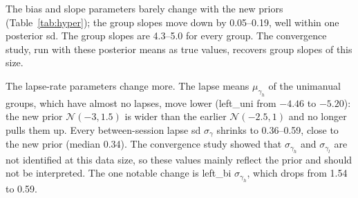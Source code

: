 \documentclass[11pt]{article}
\begin{document}
\begin{table}[H]
\centering
\caption{Hyperparameters under the earlier and current priors: posterior mean
(sd). Lapse-rate means $\mu_\gamma$ are on the logit scale.}
\label{tab:hyper}
\end{table}

The bias and slope parameters barely change with the new priors
(Table~\ref{tab:hyper}); the group slopes move down by 0.05--0.19, well
within one posterior sd. The group slopes are 4.3--5.0 for every group. The
convergence study, run with these posterior means as true values, recovers group
slopes of this size.

The lapse-rate parameters change more. The lapse means $\mu_{\gamma_h}$ of the
unimanual groups, which have almost no lapses, move lower (left\_uni from
$-4.46$ to $-5.20$): the new prior $\mathcal{N}(-3, 1.5)$ is wider than the
earlier $\mathcal{N}(-2.5, 1)$ and no longer pulls them up. Every between-session lapse sd $\sigma_\gamma$ shrinks
to 0.36--0.59, close to the new prior (median 0.34). The convergence study
showed that $\sigma_{\gamma_h}$ and $\sigma_{\gamma_l}$ are not identified at
this data size, so these values mainly reflect the prior and should not be
interpreted. The one notable change is left\_bi $\sigma_{\gamma_h}$, which
drops from 1.54 to 0.59.
\end{document}
